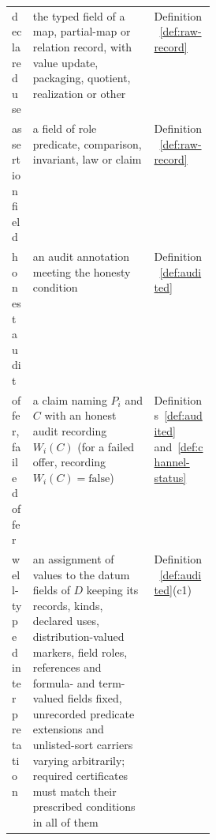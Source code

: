 \begin{center}
\begin{tabularx}{\linewidth}{@{}l>{\raggedright\arraybackslash}X>{\raggedright\arraybackslash}p{0.30\linewidth}@{}}
declared use & the typed field of a map, partial-map or relation record, with value update, packaging, quotient, realization or other & Definition~\ref{def:raw-record} \\
assertion field & a field of role predicate, comparison, invariant, law or claim & Definition~\ref{def:raw-record} \\
honest audit & an audit annotation meeting the honesty condition & Definition~\ref{def:audited} \\
offer, failed offer & a claim naming \(P_i\) and \(C\) with an honest audit recording \(W_i(C)\) (for a failed offer, recording \(W_i(C)=\mathrm{false}\)) & Definitions~\ref{def:audited} and~\ref{def:channel-status} \\
well-typed interpretation & an assignment of values to the datum fields of \(D\) keeping its records, kinds, declared uses, distribution-valued markers, field roles, references and formula- and term-valued fields fixed, unrecorded predicate extensions and unlisted-sort carriers varying arbitrarily; required certificates must match their prescribed conditions in all of them & Definition~\ref{def:audited}(c1) \\
\bottomrule
\end{tabularx}
\end{center}

